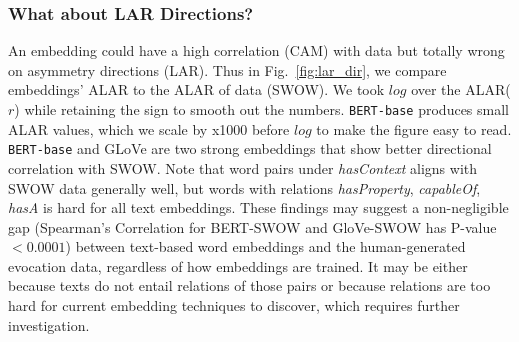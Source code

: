 \documentclass[letterpaper]{article} %
\begin{document}
\subsubsection{What about LAR Directions?} An embedding could have a high correlation (CAM) with data but totally wrong on asymmetry directions (LAR). Thus in Fig.~\ref{fig:lar_dir}, we compare embeddings' ALAR to the ALAR of data (SWOW). We took $log$ over the ALAR($r$) while retaining the sign to smooth out the numbers. \texttt{BERT-base} produces small ALAR values, which we scale by x1000 before $log$ to make the figure easy to read. \texttt{BERT-base} and GLoVe are two strong embeddings that show better directional correlation with SWOW. Note that word pairs under \textit{hasContext} aligns with SWOW data generally well, but words with relations \textit{hasProperty}, \textit{capableOf}, \textit{hasA} is hard for all text embeddings. These findings may suggest a non-negligible gap (Spearman's Correlation for BERT-SWOW and GloVe-SWOW has P-value$<0.0001$) between text-based word embeddings and the human-generated evocation data, regardless of how embeddings are trained. It may be either because texts do not entail relations of those pairs or because relations are too hard for current embedding techniques to discover, which requires further investigation.
\end{document}
